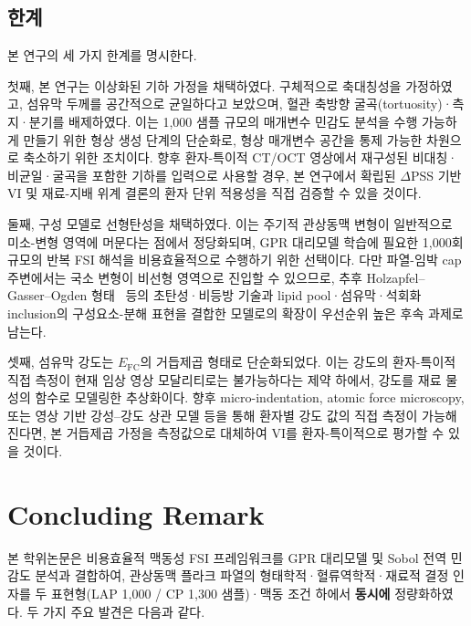 \documentclass[master,english,final]{kaist-ucs}
\begin{document}
\section{한계}

본 연구의 세 가지 한계를 명시한다.

첫째, 본 연구는 이상화된 기하 가정을 채택하였다. 구체적으로 축대칭성을 가정하였고, 섬유막 두께를 공간적으로 균일하다고 보았으며, 혈관 축방향 굴곡(tortuosity)·측지·분기를 배제하였다. 이는 1{,}000 샘플 규모의 매개변수 민감도 분석을 수행 가능하게 만들기 위한 형상 생성 단계의 단순화로, 형상 매개변수 공간을 통제 가능한 차원으로 축소하기 위한 조치이다. 향후 환자-특이적 CT/OCT 영상에서 재구성된 비대칭·비균일·굴곡을 포함한 기하를 입력으로 사용할 경우, 본 연구에서 확립된 $\Delta$PSS 기반 VI 및 재료-지배 위계 결론의 환자 단위 적용성을 직접 검증할 수 있을 것이다.

둘째, 구성 모델로 선형탄성을 채택하였다. 이는 주기적 관상동맥 변형이 일반적으로 미소-변형 영역에 머문다는 점에서 정당화되며, GPR 대리모델 학습에 필요한 1{,}000회 규모의 반복 FSI 해석을 비용효율적으로 수행하기 위한 선택이다. 다만 파열-임박 cap 주변에서는 국소 변형이 비선형 영역으로 진입할 수 있으므로, 추후 Holzapfel--Gasser--Ogden 형태~\cite{hgo} 등의 초탄성·비등방 기술과 lipid pool·섬유막·석회화 inclusion의 구성요소-분해 표현을 결합한 모델로의 확장이 우선순위 높은 후속 과제로 남는다.

셋째, 섬유막 강도는 $E_\mathrm{FC}$의 거듭제곱 형태로 단순화되었다. 이는 강도의 환자-특이적 직접 측정이 현재 임상 영상 모달리티로는 불가능하다는 제약 하에서, 강도를 재료 물성의 함수로 모델링한 추상화이다. 향후 micro-indentation, atomic force microscopy, 또는 영상 기반 강성--강도 상관 모델 등을 통해 환자별 강도 값의 직접 측정이 가능해진다면, 본 거듭제곱 가정을 측정값으로 대체하여 VI를 환자-특이적으로 평가할 수 있을 것이다.


\chapter{Concluding Remark}

본 학위논문은 비용효율적 맥동성 FSI 프레임워크를 GPR 대리모델 및 Sobol 전역 민감도 분석과 결합하여, 관상동맥 플라크 파열의 형태학적·혈류역학적·재료적 결정 인자를 두 표현형(LAP 1{,}000 / CP 1{,}300 샘플)·맥동 조건 하에서 \textbf{동시에} 정량화하였다. 두 가지 주요 발견은 다음과 같다.
\end{document}
